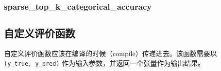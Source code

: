 \begin{Shaded}
\begin{Highlighting}[]
\OperatorTok{=}\NormalTok{)}
\end{Highlighting}
\end{Shaded}



\subsubsection{sparse\_top\_k\_categorical\_accuracy}\label{sparseux5ftopux5fkux5fcategoricalux5faccuracy}

\begin{Shaded}
\begin{Highlighting}[]
\OperatorTok{=}\NormalTok{)}
\end{Highlighting}
\end{Shaded}



\subsection{自定义评价函数}\label{custom-metrics}

自定义评价函数应该在编译的时候（compile）传递进去。该函数需要以
\texttt{(y\_true,\ y\_pred)} 作为输入参数，并返回一个张量作为输出结果。

\begin{Shaded}
\begin{Highlighting}[]
  

 
     

\OperatorTok{=}\NormalTok{,}
              \OperatorTok{=}\NormalTok{,}
              \OperatorTok{=}\NormalTok{[}\NormalTok{, mean_pred])}
\end{Highlighting}
\end{Shaded}
\newpage
